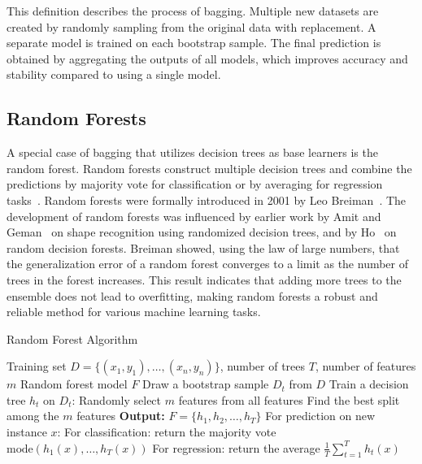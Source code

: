 \documentclass[conference]{IEEEtran}
\begin{document}
This definition describes the process of bagging. Multiple new datasets are created by randomly sampling from the original data with replacement. A separate model is trained on each bootstrap sample. The final prediction is obtained by aggregating the outputs of all models, which improves accuracy and stability compared to using a single model.

\subsection{Random Forests}

A special case of bagging that utilizes decision trees as base learners is the random forest. Random forests construct multiple decision trees and combine the predictions by majority vote for classification or by averaging for regression tasks~\cite{10.1007/978-3-642-31537-4_13}. Random forests were formally introduced in 2001 by Leo Breiman~\cite{Breiman2001}. The development of random forests was influenced by earlier work by Amit and Geman~\cite{10.1162/neco.1997.9.7.1545} on shape recognition using randomized decision trees, and by Ho~\cite{Ho1995} on random decision forests. Breiman showed, using the law of large numbers, that the generalization error of a random forest converges to a limit as the number of trees in the forest increases. This result indicates that adding more trees to the ensemble does not lead to overfitting, making random forests a robust and reliable method for various machine learning tasks.

\begin{algorithm}[H]
    \caption{Random Forest Algorithm}
    \label{alg:random_forest}
\begin{algorithmic}[1]
\REQUIRE Training set $D = \{(x_1, y_1), \ldots, (x_n, y_n)\}$, number of trees $T$, number of features $m$
\ENSURE Random forest model $F$
    \STATE Draw a bootstrap sample $D_t$ from $D$
    \STATE Train a decision tree $h_t$ on $D_t$:
            \STATE Randomly select $m$ features from all features
            \STATE Find the best split among the $m$ features
        \ENDFOR
\ENDFOR
\STATE \textbf{Output:} $F = \{h_1, h_2, \ldots, h_T\}$
\STATE For prediction on new instance $x$:
    \STATE \hspace{1em} For classification: return the majority vote $\text{mode}(h_1(x), \ldots, h_T(x))$
    \STATE \hspace{1em} For regression: return the average $\frac{1}{T} \sum_{t=1}^T h_t(x)$
\end{algorithmic}
\end{algorithm}
\end{document}
